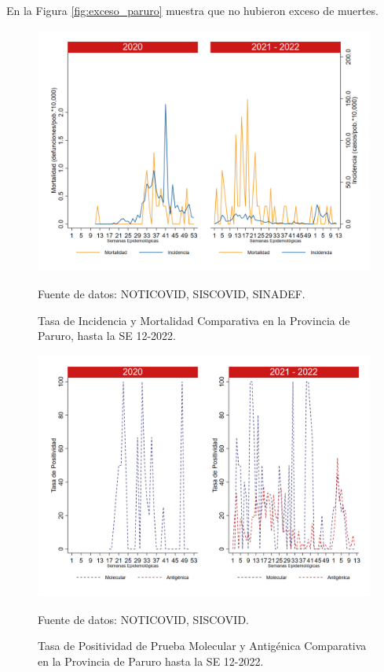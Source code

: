 \documentclass[12pt,a4paper,openany]{book}
\begin{document}
	 En la Figura \ref{fig:exceso_paruro} muestra que no hubieron exceso de muertes. 
		
		\begin{figure}[h]
			\caption{Tasa de Incidencia y Mortalidad Comparativa en la Provincia de Paruro, hasta la SE 12-2022.}\label{fig:inc_mort_paruro}
			\begin{center}
				\includegraphics[width=0.85\linewidth]{../figuras/incidencia_mortalidad_20_21_10.png}
			\end{center}
			{\footnotesize {Fuente de datos: NOTICOVID, SISCOVID, SINADEF.}} 
		\end{figure}
		
		\begin{figure}[h]
			\caption{Tasa de Positividad de Prueba Molecular y Antigénica Comparativa en la Provincia de Paruro hasta la SE 12-2022.}\label{fig:positividad_paruro}
			\begin{center}
				\includegraphics[width=0.7\linewidth]{../figuras/positividad_20_21_10.png}
			\end{center}
			{\footnotesize {Fuente de datos: NOTICOVID, SISCOVID.}}
		\end{figure}
		
\end{document}
